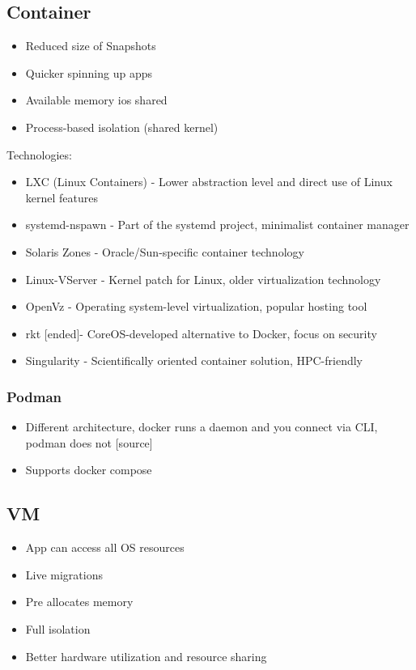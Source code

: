 \documentclass[../Main.tex]{subfiles}
\begin{document}
\subsection{Container}
\begin{itemize}
    \item Reduced size of Snapshots
    \item Quicker spinning up apps 
    \item Available memory ios shared
    \item Process-based isolation (shared kernel)
\end{itemize}

Technologies:
\begin{itemize}
    \item LXC (Linux Containers) - Lower abstraction level and direct use of Linux kernel features
    \item systemd-nspawn - Part of the systemd project, minimalist container manager
    \item Solaris Zones - Oracle/Sun-specific container technology
    \item Linux-VServer - Kernel patch for Linux, older virtualization technology
    \item OpenVz - Operating system-level virtualization, popular hosting tool
    \item rkt [ended]- CoreOS-developed alternative to Docker, focus on security
    \item Singularity - Scientifically oriented container solution, HPC-friendly
\end{itemize}

\subsubsection{Podman}
\begin{itemize}
    \item  Different architecture, docker runs a daemon and you connect via CLI, podman does not [source]
    \item Supports docker compose
\end{itemize}

\subsection{VM}
\begin{itemize}
    \item App can access all OS resources
    \item Live migrations
    \item Pre allocates memory
    \item Full isolation
    \item Better hardware utilization and resource sharing
\end{itemize}
\end{document}
